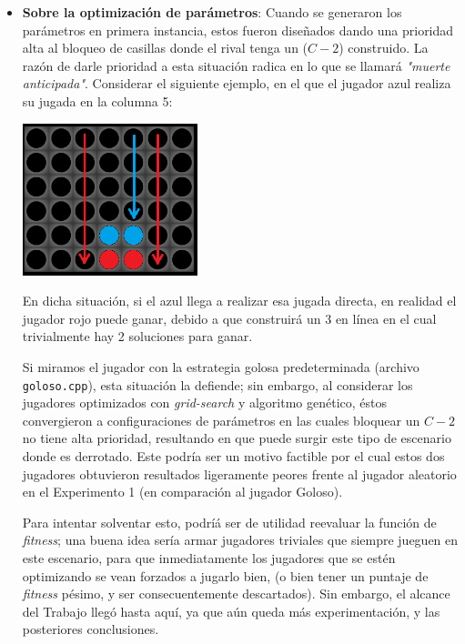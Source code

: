 \documentclass[12pt,a4paper]{article}
\begin{document}
\begin{itemize}
                \item \textbf{Sobre la optimización de parámetros}: Cuando se generaron los parámetros en primera instancia, estos fueron diseñados dando una prioridad alta al bloqueo de casillas donde el rival tenga un ($C-2$) construido. La razón de darle prioridad a esta situación radica en lo que se llamará \textit{"muerte anticipada"}. Considerar el siguiente ejemplo, en el que el jugador azul realiza su jugada en la columna 5:
                
                \begin{center}
                \includegraphics[width=0.4\textwidth]{muerteHorizontal.png}
                \end{center}
                
                En dicha situación, si el azul llega a realizar esa jugada directa, en realidad el jugador rojo puede ganar, debido a que construirá un 3 en línea en el cual trivialmente hay 2 soluciones para ganar.
                
                Si miramos el jugador con la estrategia golosa predeterminada (archivo \texttt{goloso.cpp}), esta situación la defiende; sin embargo, al considerar los jugadores optimizados con \textit{grid-search} y algoritmo genético, éstos convergieron a configuraciones de parámetros en las cuales bloquear un $C-2$ no tiene alta prioridad, resultando en que puede surgir este tipo de escenario donde es derrotado. Este podría ser un motivo factible por el cual estos dos jugadores obtuvieron resultados ligeramente peores frente al jugador aleatorio en el Experimento 1 (en comparación al jugador Goloso).
                
                Para intentar solventar esto, podríá ser de utilidad reevaluar la función de \textit{fitness}; una buena idea sería armar jugadores triviales que siempre jueguen en este escenario, para que inmediatamente los jugadores que se estén optimizando se vean forzados a jugarlo bien, (o bien  tener un puntaje de \textit{fitness} pésimo, y ser consecuentemente descartados). Sin embargo, el alcance del Trabajo llegó hasta aquí, ya que aún queda más experimentación, y las posteriores conclusiones.
                
    \end{itemize}
    
\end{document}

